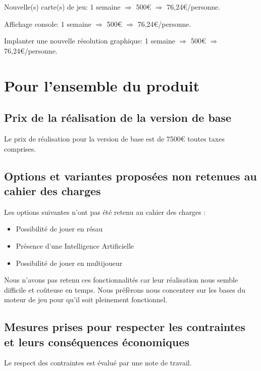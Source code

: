 \documentclass[11pt]{report}
\begin{document}
				Nouvelle(s) carte(s) de jeu: 1 semaine $\Rightarrow$ 500\euro{} $\Rightarrow$ 76,24\euro /personne.
				
				Affichage console: 1 semaine $\Rightarrow$ 500\euro{} $\Rightarrow$ 76,24\euro /personne.
				
				Implanter une nouvelle résolution graphique: 1 semaine $\Rightarrow$ 500\euro{} $\Rightarrow$ 76,24\euro /personne.
			
		\section{Pour l’ensemble du produit}
		
			\subsection{Prix de la réalisation de la version de base}
			
				Le prix de réalisation pour la version de base est de 7500\euro{} toutes taxes comprises.
			
			\subsection{Options et variantes proposées non retenues au cahier des charges}
			
				Les options suivantes n’ont pas été retenu au cahier des charges :
				\begin{itemize}
                	\item Possibilité de jouer en résau
		            \item Présence d’une Intelligence Artificielle
		            \item Possibilité de jouer en multijoueur
                \end{itemize}
                
                Nous n’avons pas retenu ces fonctionnalités car leur réalisation nous semble difficile et coûteuse en temps. Nous préfèrons nous concentrer sur les bases du moteur de jeu pour qu’il soit pleinement fonctionnel.
                
			\subsection{Mesures prises pour respecter les contraintes et leurs conséquences économiques}
			
				Le respect des contraintes est évalué par une note de travail.
			
\end{document}

